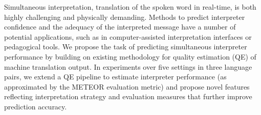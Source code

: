 Simultaneous interpretation, translation of the spoken word in real-time, is both highly challenging and physically demanding. Methods to predict interpreter confidence and the adequacy of the interpreted message have a number of potential applications, such as in computer-assisted interpretation interfaces or pedagogical tools. We propose the task of predicting simultaneous interpreter performance by building on existing methodology for quality estimation (QE) of machine translation output. In experiments over five settings in three language pairs, we extend a QE pipeline to estimate interpreter performance (as approximated by the METEOR evaluation metric) and propose novel features reflecting interpretation strategy and evaluation measures that further improve prediction accuracy.
